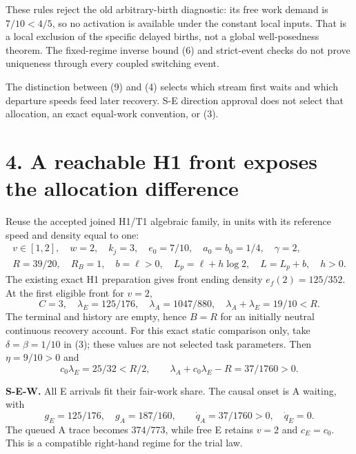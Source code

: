 \documentclass[11pt,a4paper]{article}
\begin{document}
These rules reject the old arbitrary-birth diagnostic: its free work demand
is $7/10<4/5$, so no activation is available under the constant local inputs.
That is a local exclusion of the specific delayed births, not a global
well-posedness theorem. The fixed-regime inverse bound (6) and strict-event
checks do not prove uniqueness through every coupled switching event.

The distinction between (9) and (4) selects which stream first waits and
which departure speeds feed later recovery. S-E direction approval does
not select that allocation, an exact equal-work convention, or (3).

\newpage
\section*{4. A reachable H1 front exposes the allocation difference}

Reuse the accepted joined H1/T1 algebraic family, in units with its reference
speed and density equal to one:
\begin{equation}
 \begin{gathered}
 v\in[1,2],\quad w=2,\quad k_j=3,\quad
 e_0=7/10,\quad a_0=b_0=1/4,\quad\gamma=2,\\
 R=39/20,\quad R_B=1,\quad b=\ell>0,\quad
 L_p=\ell+h\log2,\quad L=L_p+b,\quad h>0.
 \end{gathered} \tag{10}
\end{equation}
The existing exact H1 preparation gives front ending density
$e_f(2)=125/352$. At the first eligible front for $v=2$,
\begin{equation}
 C=3,\quad \lambda_E=125/176,\quad
 \lambda_A=1047/880,\quad\lambda_A+\lambda_E=19/10<R. \tag{11}
\end{equation}
The terminal and history are empty, hence $B=R$ for an initially neutral
continuous recovery account. For this exact static comparison only, take
$\delta=\beta=1/10$ in (3); these values are not selected task parameters.
Then $\eta=9/10>0$ and
\begin{equation}
 c_0\lambda_E=25/32<R/2,\qquad
 \lambda_A+c_0\lambda_E-R=37/1760>0. \tag{12}
\end{equation}

\textbf{S-E-W.} All E arrivals fit their fair-work share. The causal onset
is A waiting, with
\begin{equation}
 g_E=125/176,\quad g_A=187/160,\qquad
 \dot q_A=37/1760>0,\quad\dot q_E=0. \tag{13}
\end{equation}
The queued A trace becomes $374/773$, while free E retains $v=2$ and
$c_E=c_0$. This is a compatible right-hand regime for the trial law.
\end{document}
